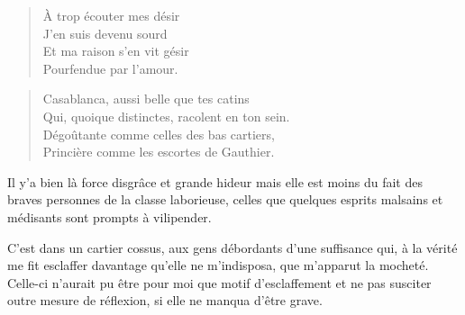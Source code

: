 \begin{verse}
À trop écouter mes désir\\
J’en suis devenu sourd\\
Et ma raison s’en vit gésir\\
Pourfendue par l’amour.
\end{verse}

\begin{verse}
Casablanca, aussi belle que tes catins\\
Qui, quoique distinctes, racolent en ton sein.\\
Dégoûtante comme celles des bas cartiers,\\
Princière comme les escortes de Gauthier.
\end{verse}

\begin{prose}
Il y’a bien là force disgrâce et grande hideur mais elle est moins du fait des braves personnes de la classe laborieuse, celles que quelques esprits malsains et médisants sont prompts à vilipender.

C’est dans un cartier cossus, aux gens débordants d’une suffisance qui, à la vérité me fit esclaffer davantage qu’elle ne m’indisposa, que m’apparut la mocheté. Celle-ci n’aurait pu être pour moi que motif d’esclaffement et ne pas susciter outre mesure de réflexion, si elle ne manqua d’être grave.
\end{prose}

